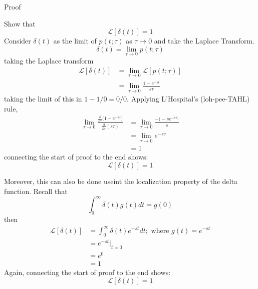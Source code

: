 \documentclass[12pt,letter]{article}
\numberwithin{ex}{section} %
\numberwithin{re}{section} %
\newcommand{\gr}[1]{\textcolor[rgb]{0.00,0.50,0.00}{#1}}
\newcommand{\Laplace}[1]{\ensuremath{\mathcal{L}{\left[#1\right]}}}
\numberwithin{equation}{section}	%
\begin{document}
\begin{mdframed}[middlelinewidth=0.5mm]
\begin{center}
\gr{Proof}
\end{center}
Show that
\begin{equation}
\Laplace{\delta(t)} = 1
\end{equation}
Consider $\delta(t)$ as the limit of $p(t;\tau) $ as $\tau \rightarrow 0$ and take the Laplace Transform. 
\begin{equation}
\delta(t) = \lim\limits_{\tau \rightarrow 0} p(t;\tau) 
\end{equation}
taking the Laplace transform
\begin{align}
\Laplace{\delta(t)} &= \lim\limits_{\tau \rightarrow 0} \Laplace{p(t;\tau)} \\ \nonumber
&=  \lim\limits_{\tau \rightarrow 0} \frac{1-e^{-st}}{s \tau}
\end{align}
taking the limit of this in ${1-1}/0 = 0/0$. Applying L'Hospital's (loh-pee-TAHL) rule, 
\begin{align}
\lim\limits_{\tau \rightarrow 0} \frac{ \frac{\partial}{\partial \tau} \big(     1-e^{-s t}    \big)  }{ \frac{\partial}{\partial \tau} (s \tau)} &= \lim\limits_{\tau \rightarrow 0} \frac{- \big(-s e^{-s \tau \big)}}{s}  \\ \nonumber
&=  \lim\limits_{\tau \rightarrow 0} e^{-s \tau} \\ \nonumber
&= 1
\end{align}
connecting the start of proof to the end shows:
\begin{equation}
\Laplace{\delta(t)} = 1
\end{equation}

Moreover, this can also be done useint the localization property of the delta function. Recall that
\begin{equation}
\int_{0}^{\infty} \delta(t) g(t) dt = g(0)
\end{equation}
then
\begin{align}
\Laplace{\delta(t)} &= \int_{0}^{\infty} \delta(t) e^{-s t} dt; \text{ where } g(t) = e^{-s t} \\ \nonumber
&= e^{-s t}\big|_{t=0} \\ \nonumber
&= e^0 \\ \nonumber
&= 1
\end{align}
Again, connecting the start of proof to the end shows:
\begin{equation}
\Laplace{\delta(t)} = 1
\end{equation}
\end{mdframed}
\end{document}
